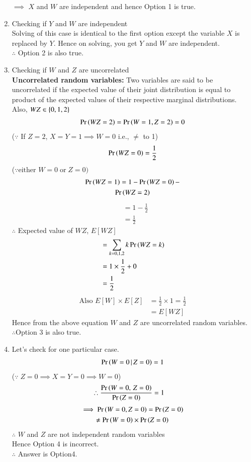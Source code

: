 \documentclass[journal,12pt,twocolumn]{IEEEtran}
\begin{document}
\begin{enumerate}
$\implies$ $X$ and $W$ are independent and hence Option 1 is true.
\item Checking if $Y$ and $W$ are independent\\
Solving of this case is identical to the first option except the variable $X$ is replaced by $Y$.
Hence on solving, you get $Y$  and $W$ are independent.\\
$\therefore$ Option 2 is also true.
\item Checking if $W$ and $Z$ are uncorrelated\\
\textbf{Uncorrelated random variables:} Two variables are said to be uncorrelated if the expected value of their joint distribution is equal to product of the expected values of their respective marginal distributions.\\
Also, $WZ \in\left\{0,1,2\right\}$
\begin{align}
    \Pr\left(WZ =2\right) = \Pr\left(W=1,Z=2\right) =0
\end{align}
($\because$ If $Z=2$, $X = Y =1 \implies W =0$ i.e., $\neq$ to 1)
\begin{align}
    \Pr\left(WZ =0\right) = \frac{1}{2}
\end{align}
($\because\text{either }W=0\;\text{or}\;Z =0)$
\begin{multline}
    \Pr\left(WZ=1\right) = 1 - \Pr\left(WZ =0\right) - \\\Pr\left(WZ =2\right)
\end{multline}
\begin{align}
    &= 1 -\frac{1}{2}\\
    &= \frac{1}{2}
\end{align}
$\therefore$ Expected value of $WZ$, $E[WZ]$
\begin{align}
    &= \sum_{k=0,1,2} k\Pr\left(WZ =k\right)\\
    &= 1 \times \frac{1}{2} +0\\
    &= \frac{1}{2}
\end{align}
\begin{align}
    \text{Also } E[W]\times E[Z] &= \frac{1}{2}\times1 = \frac{1}{2}\\
                                 &= E[WZ]
\end{align}
Hence from the above equation $W$ and $Z$ are uncorrelated random variables.\\
$\therefore$Option 3 is also true.
\item Let's check for one particular case.
\begin{align}
    \Pr\left(W=0\,|\,Z=0\right) = 1
\end{align}
($\because\;Z=0 \implies X = Y =0 \implies W=0$)
\begin{align}
    \therefore \frac{\Pr\left(W=0,\,Z=0\right)}{\Pr\left(Z=0\right)} &= 1
\end{align}
\begin{multline}
   \implies\Pr\left(W=0,Z=0\right) =\Pr\left(Z=0\right) \\
                       \neq\Pr\left(W=0\right)\times\Pr\left(Z=0\right)   
\end{multline}
$\therefore$ $W$ and $Z$ are not independent random variables\\
Hence Option 4 is incorrect.\\
$\therefore$ Answer is Option4.
    
\end{enumerate}
  
 
 
 
\end{document}

